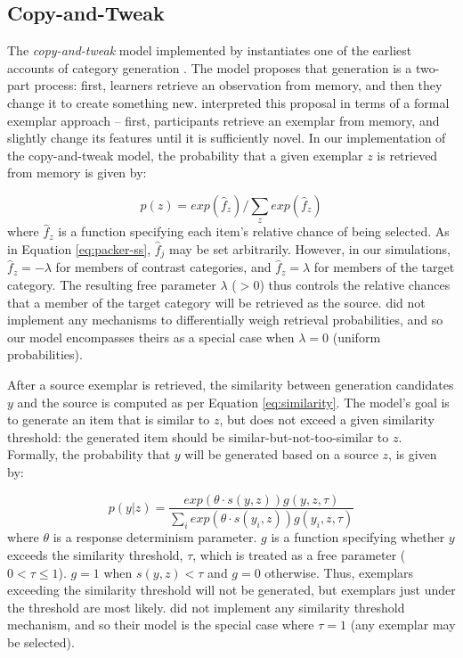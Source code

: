 \documentclass[10pt,letterpaper]{article}
\begin{document}
\subsection{Copy-and-Tweak}

The \textit{copy-and-tweak} model implemented by \citet{jern2013probabilistic} instantiates one of the earliest accounts of category generation \citep[see][]{ward2002role,ward1995s}. The model proposes that generation is a two-part process: first, learners retrieve an observation from memory, and then they change it to create something new. \citet{jern2013probabilistic} interpreted this proposal in terms of a formal exemplar approach -- first, participants retrieve an exemplar from memory, and slightly change its features until it is sufficiently novel. In our implementation of the copy-and-tweak model, the probability that a given exemplar $z$ is retrieved from memory is given by: 

\begin{equation}
p(z) = exp(\hat{f}_z) / \sum_z{ exp(\hat{f}_z) }
\end{equation}
%
where $\hat{f}_z$ is a function specifying each item's relative chance of being selected. As in Equation \ref{eq:packer-ss}, $\hat{f}_j$ may be set arbitrarily. However, in our simulations, $\hat{f}_z = -\lambda$ for members of contrast categories, and $\hat{f}_z = \lambda$ for members of the target category. The resulting free parameter $\lambda$ ($>0$) thus controls the relative chances that a member of the target category will be retrieved as the source. \citet{jern2013probabilistic} did not implement any mechanisms to differentially weigh retrieval probabilities, and so our model encompasses theirs as a special case when $\lambda = 0$ (uniform probabilities).

After a source exemplar is retrieved, the similarity between generation candidates $y$ and the source is computed as per Equation \ref{eq:similarity}. The model's goal is to generate an item that is similar to $z$, but does not exceed a given similarity threshold: the generated item should be similar-but-not-too-similar to $z$. Formally, the probability that $y$ will be generated based on a source $z$, is given by:

\begin{equation}
    p(y|z)  = \dfrac
    { exp(\theta \cdot s(y,z)) g(y,z,\tau)}
    {\sum_i{exp(\theta \cdot s(y_i,z)) g(y_i,z,\tau)}} 
\end{equation}
% 
where $\theta$ is a response determinism parameter. $g$ is a function specifying whether $y$ exceeds the similarity threshold, $\tau$, which is treated as a free parameter ($0<\tau\leq1$). $g = 1$ when $s(y,z) < \tau$ and $g = 0$ otherwise. Thus, exemplars exceeding the similarity threshold will not be generated, but exemplars just under the threshold are most likely. \citet{jern2013probabilistic} did not implement any similarity threshold mechanism, and so their model is the special case where $\tau = 1$ (any exemplar may be selected).
\end{document}

